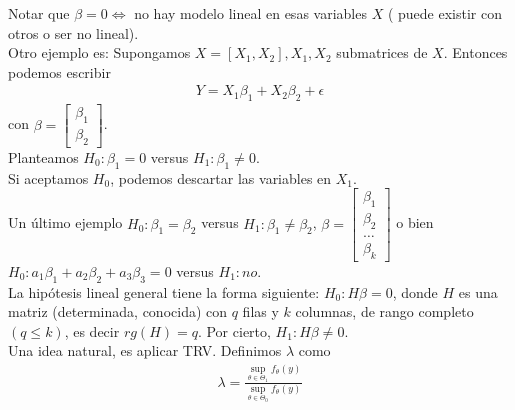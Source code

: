 \documentclass[10pt]{article}
\theoremstyle{plain}
\theoremstyle{definition}
\begin{document}
Notar que $\beta = 0 \Leftrightarrow$ no hay modelo lineal en esas variables $X$ ( puede existir con otros o ser no lineal). \\

Otro ejemplo es: Supongamos $X = [X_{1},X_{2}], X_{1}, X_{2}$ submatrices de $X$. Entonces podemos escribir
\begin{align*}
Y=X_{1}\beta_{1}+ X_{2}\beta_{2}+\epsilon
\end{align*}
con $\beta = \begin{bmatrix}
\beta_{1}\\ \beta_{2}
\end{bmatrix}$.\\

Planteamos $H_{0}\colon \beta_{1}=0$ versus $H_{1}\colon \beta_{1} \not = 0$.\\

Si aceptamos $H_{0}$, podemos descartar las variables en $X_{1}$.\\

Un último ejemplo $H_{0}\colon \beta_{1}=\beta_{2}$ versus $H_{1}\colon \beta_{1}\not = \beta_{2}$, $\beta = \begin{bmatrix}
\beta_{1}\\ \beta_{2} \\ \ldots \\ \beta_{k}
\end{bmatrix}$ o bien $H_{0} \colon a_{1}\beta_{1} + a_{2}\beta_{2} + a_{3}\beta_{3} = 0$ versus $H_{1}\colon no$.\\

La hipótesis lineal general tiene la forma siguiente: $H_{0}\colon H\beta = 0$, donde $H$ es una matriz (determinada, conocida) con $q$ filas y $k$ columnas, de rango completo $(q\le k)$, es decir $rg(H) = q$. Por cierto, $H_{1}\colon H\beta \not = 0$.\\

Una idea natural, es aplicar TRV. Definimos $\lambda$ como
\begin{align*}
\lambda = \frac{\sup_{\theta\in\Theta_{1}} f_{\theta}(y)}{\sup_{\theta\in\Theta_{0}}f_{\theta}(y)}
\end{align*}
\end{document}
